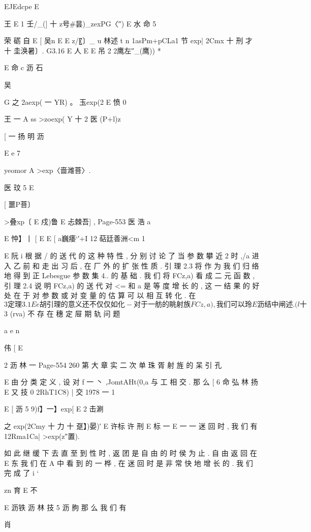 {{EJEdcpe
E

王
E 1 壬/_(] 十 z号#昙)_zexPG〈″) E 水
命 5

荣 砺 自
E [ 吴n
E E z/〖〕_
u 林述 t n
1asPm+pCLa1 节 exp| 2Cmx 十 刑 才 十 圭涣暑〕. G3.16
E 人
E E 吊 2 2鹰左″_(鹰)) *

E 命 c 沥 石

吴

G
之 2aexp( 一 YR) 。 玉exp(2 E 愤 0

王 一 A ss
>zoexp( Y 十 2 医 (P+l)z

[ 一 扬 明 沥

E
e 7

yeomor A >exp〈啬潍菩〉.

医 玟 5
E

[ 噩P菩〕

>叠xp〔 E 戍)鲁 E 忐棘吾] ,
Page-553
医 浩 a

E 忡】丨
[
E
E
[
a巍痿`′+I 12
萜廷善洲<m 1

E
阮
i
根 据 / 的 送 代 的 这 种 特 性 , 分 别 讨 论 了 当 参 数 攀 近 2 时 ,/a 进 入
乙 前 和 走 出 习 后 , 在 厂 外 的 扩 张 性 质 . 引 理 2.3 将 作 为 我 们 归 络
地 得 到 正 Lebesgue 参 数 集 4.. 的 基 础 . 我 们 将 FCz,a) 看 成 二 元 函
数 , 引 理 2.4 说 明 FCz,a) 的 送 代 对 <= 和 a 是 等 度 增 长 的 , 这 一 结 果
的 好 处 在 于 对 参 数 或 对 变 量 的 估 算 可 以 相 互 转 化 . 在 $ 3 定 理 3.1
E e 胡
引 理 的 意 义 还 不 仅 仅 如 化 - 对 于 一 舫 的 眺 射 族 FCz,a), 我 们 可 以
玲
E 沥
结 中 闸 述 .

(l十

$ 3 (rva) 不 存 在 穗 定 屉 期 轨 问 题

a
e
n

伟 [
E

2 沥 林 一
Page-554
260 第 大 章 实 二 次 单 珠 胥 射 旌 的 呆 引 孔

E
由 分 类 定 义 , 设 对 f 一 丶 ,JomtAHt(0,a 与 工 相 交 . 那 么
[ 6 命 弘 林 扬
E 又 技
0
2RhT1C8) | 交 1978 一 1

E
[ 沥 5 9)f】一】exp[ E 2 击涮

之 exp(2Cmy 十 力 十 趸】)晏)′
E 许标 许 刑
E 标 一
E 一 一
迷 回 时 , 我 们 有
12Rma1Ca| >exp(z″置).

如 此 继 缓 下 去 直 至 到 性 时 , 返 团 是 自 由 的 时 侯 为 止 . 自 由 返 回 在
E 东
我 们 在 A 中 看 到 的 一 桦 , 在 迷 回 时 是 非 常 快 地 增 长 的 . 我 们 完 成 了
i `

zn 育
E 不

E 沥铁 沥 林 技 5 沥 朐
那 么 我 们 有

肖

}}
